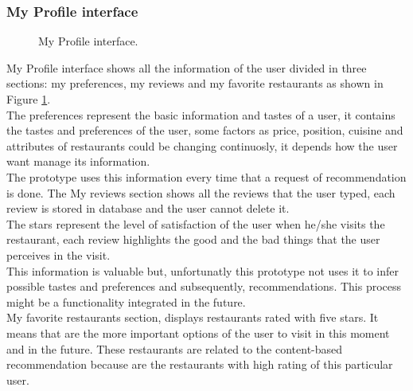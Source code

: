 \subsubsection{My Profile interface}

\begin{figure}
\captionsetup{font=footnotesize}
\centering
{}
\caption{My Profile interface.}
\label{fig:myprofile}   
\end{figure}
My Profile interface shows all the information of the user divided in
three sections: my preferences, my reviews and my favorite restaurants
as shown in Figure  \ref{fig:myprofile}. \\ The preferences represent the basic
information and tastes of a user, it contains the tastes and preferences
of the user, some factors as price, position, cuisine and attributes
of restaurants could be changing continuosly, it depends how the user
want manage its information.\\ The prototype uses this information every
time that a request of recommendation is done.
The My reviews section shows all the reviews that the user typed, each
review is stored in database and the user cannot delete it. \\ The stars
represent the level of satisfaction of the user when he/she visits the
restaurant, each review highlights the good and the bad things that
the user perceives in the visit. \\ This information is valuable but,
unfortunatly this prototype not uses it to infer possible tastes and
preferences and subsequently, recommendations. This process might be a
functionality integrated in the future.\\
My favorite restaurants section, displays restaurants rated with five
stars. It means that are the more important options of the user to
visit in this moment and in the future. These restaurants are related
to the content-based recommendation because are the restaurants with
high rating of this particular user.

